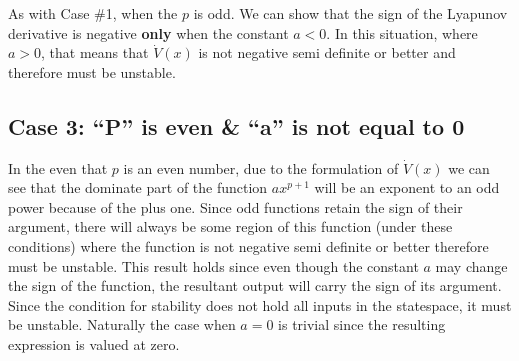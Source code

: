 As with Case \#1, when the $p$ is odd. We can show that the sign of the Lyapunov derivative is negative \textbf{only} when the constant $a <0$. In this situation, where $a >0$, that means that $\dot{V}(x)$ is not negative semi definite or better and therefore must be unstable.

\subsection*{Case 3: ``P'' is even \& ``a'' is not equal to  0 }

In the even that $p$ is an even number, due to the formulation of $\dot{V}(x)$ we can see that the dominate part of the function $ax^{p+1}$ will be an exponent to an odd power because of the plus one. Since odd functions retain the sign of their argument, there will always be some region of this function (under these conditions) where the function is not negative semi definite or better therefore must be unstable. This result holds since even though the constant $a$ may change the sign of the function, the resultant output will carry the sign of its argument. Since the condition for stability does not hold all inputs in the statespace, it must be unstable. Naturally the case when $a=0$ is trivial since the resulting expression is valued at zero.   
